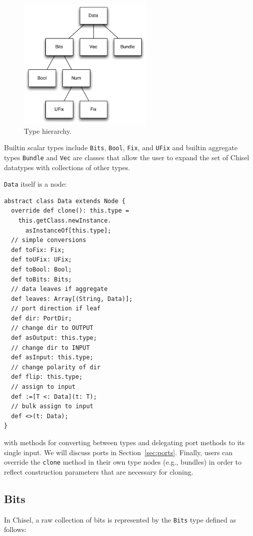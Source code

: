 \documentclass[10pt,twocolumn]{article}
\def\code#1{{\small\tt #1}}
\begin{document}
\begin{figure}[h]
\centering
\includegraphics[height=2.5in]{figs/type-hierarchy.pdf}
\caption{Type hierarchy.}
\label{fig:type-hierarchy}
\end{figure}

\noindent
Builtin scalar types include \code{Bits}, \code{Bool}, \code{Fix}, and
\code{UFix} and builtin aggregate types \code{Bundle} and \code{Vec}
are classes that allow the user to expand
the set of Chisel datatypes with collections of other types.

\code{Data} itself is a node:

\begin{lstlisting}
abstract class Data extends Node {
  override def clone(): this.type =
    this.getClass.newInstance.
      asInstanceOf[this.type];
  // simple conversions
  def toFix: Fix;
  def toUFix: UFix;
  def toBool: Bool;
  def toBits: Bits;
  // data leaves if aggregate
  def leaves: Array[(String, Data)];
  // port direction if leaf
  def dir: PortDir;
  // change dir to OUTPUT
  def asOutput: this.type;
  // change dir to INPUT
  def asInput: this.type;
  // change polarity of dir
  def flip: this.type;
  // assign to input
  def :=[T <: Data](t: T);
  // bulk assign to input
  def <>(t: Data);
}
\end{lstlisting}

\noindent
with methods for converting between types and 
delegating port methods to its single input.   
We will discuss ports in Section~\ref{sec:ports}.
Finally, users can override the \code{clone} method in their own type nodes (e.g., bundles) in
order to reflect construction parameters that are necessary for cloning.

\subsection{Bits}

In Chisel, a raw collection of bits is represented by the \code{Bits} type defined as follows:
\end{document}
